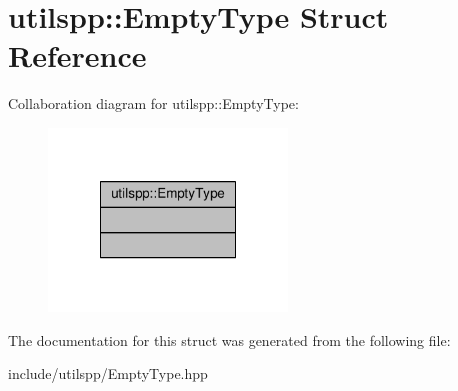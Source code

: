 \hypertarget{structutilspp_1_1EmptyType}{\section{utilspp\-:\-:Empty\-Type Struct Reference}
\label{structutilspp_1_1EmptyType}
}


Collaboration diagram for utilspp\-:\-:Empty\-Type\-:\nopagebreak
\begin{figure}[H]
\begin{center}
\leavevmode
\includegraphics[width=180pt]{structutilspp_1_1EmptyType__coll__graph}
\end{center}
\end{figure}


The documentation for this struct was generated from the following file\-:\begin{DoxyCompactItemize}
\item 
include/utilspp/Empty\-Type.\-hpp\end{DoxyCompactItemize}
